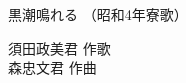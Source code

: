 \documentclass[10pt,b5j]{tarticle} %
\begin{document}
\begin{minipage}[c]{0.7\hsize} %
    \begin{center}
        {\LARGE
            黒潮鳴れる %
        }
        {\small 
            （昭和4年寮歌） %
        }
    \end{center}
\end{minipage}
\begin{minipage}[c]{0.3\hsize} %
    \begin{flushright} %
        須田政美君 作歌\\森忠文君 作曲 %
    \end{flushright}
\end{minipage}
\end{document}
